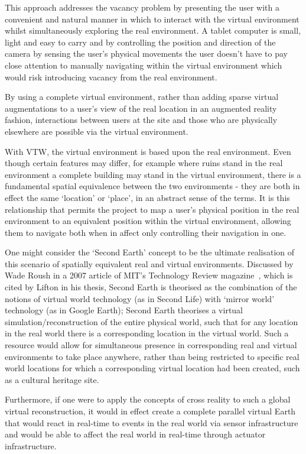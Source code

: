 This approach addresses the vacancy problem by presenting the user with a convenient and natural manner in which to interact with the virtual environment whilst simultaneously exploring the real environment. A tablet computer is small, light and easy to carry and by controlling the position and direction of the camera by sensing the user's physical movements the user doesn't have to pay close attention to manually navigating within the virtual environment which would risk introducing vacancy from the real environment.

By using a complete virtual environment, rather than adding sparse virtual augmentations to a user's view of the real location in an augmented reality fashion, interactions between users at the site and those who are physically elsewhere are possible via the virtual environment.

With VTW, the virtual environment is based upon the real environment. Even though certain features may differ, for example where ruins stand in the real environment a complete building may stand in the virtual environment, there is a fundamental spatial equivalence between the two environments - they are both in effect the same `location' or `place', in an abstract sense of the terms. It is this relationship that permits the project to map a user's physical position in the real environment to an equivalent position within the virtual environment, allowing them to navigate both when in affect only controlling their navigation in one.

One might consider the `Second Earth' concept to be the ultimate realisation of this scenario of spatially equivalent real and virtual environments. Discussed by Wade Roush in a 2007 article of MIT's Technology Review magazine~\cite{Roush2007}, which is cited by Lifton in his thesis, Second Earth is theorised as the combination of the notions of virtual world technology (as in Second Life) with `mirror world' technology (as in Google Earth); Second Earth theorises a virtual simulation/reconstruction of the entire physical world, such that for any location in the real world there is a corresponding location in the virtual world. Such a resource would allow for simultaneous presence in corresponding real and virtual environments to take place anywhere, rather than being restricted to specific real world locations for which a corresponding virtual location had been created, such as a cultural heritage site.

Furthermore, if one were to apply the concepts of cross reality to such a global virtual reconstruction, it would in effect create a complete parallel virtual Earth that would react in real-time to events in the real world via sensor infrastructure and would be able to affect the real world in real-time through actuator infrastructure.

